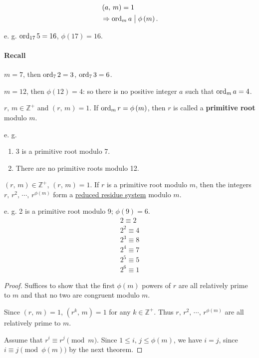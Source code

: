 \begin{corollary}
    \begin{align*}
        & \left(a,\,m\right)=1 \\
        &\Rightarrow \operatorname{\mathrm{ord}}_m a \bigm| \phi\left(m\right).
    \end{align*}
\end{corollary}

e. g. $\operatorname{\mathrm{ord}}_{17} 5 = 16$, $\phi\left(17\right)=16$.

\paragraph{Recall} $m=7$, then $\operatorname{\mathrm{ord}}_7 2 = 3$, $\operatorname{\mathrm{ord}}_7 3 = 6$.

$m=12$, then $\phi\left(12\right)=4$: so there is no positive integer $a$
such that $\operatorname{\mathrm{ord}}_m a = 4$.

\begin{definition}
    $r,\,m \in \mathbb{Z}^+$ and $\left(r,\,m\right)=1$.
    If $\operatorname{\mathrm{ord}}_m r=\phi\left(m\right)$, then $r$ is called a \textbf{primitive root}
    modulo $m$.   
\end{definition}
e. g.
\begin{enumerate}
    \item 3 is a primitive root modulo 7.
    \item There are no primitive roots modulo 12.
\end{enumerate}

\begin{theorem}
    $\left(r,\,m\right) \in \mathbb{Z}^+$, $\left(r,\,m\right)=1$.
    If $r$ is a primitive root modulo $m$, then the integers
    $r,\,r^2,\,\cdots,\,r^{\phi\left(m\right)}$ form a \underline{reduced residue system}
    modulo $m$.
\end{theorem}

e. g. 2 is a primitive root modulo 9; $\phi\left(9\right)=6$.
\begin{align*}
    2 \equiv 2 \\
    2^2 \equiv 4 \\
    2^3 \equiv 8 \\
    2^4 \equiv 7 \\
    2^5 \equiv 5 \\
    2^6 \equiv 1
\end{align*}

\begin{proof}
    Suffices to show that the first $\phi\left(m\right)$ powers of
    $r$ are all relatively prime to $m$ and that no two are
    congruent modulo $m$.

    Since $\left(r,\,m\right)=1$, $\left(r^k,\,m\right)=1$ for any $k \in \mathbb{Z}^+$.
    Thus $r,\,r^2,\,\cdots,\,r^{\phi\left(m\right)}$ are all relatively prime to $m$.

    Assume that $r^i \equiv r^j \pmod{m}$. Since $1 \leq i,\,j \leq \phi\left(m\right)$, we have
    $i=j$, since $i \equiv j \pmod{\phi\left(m\right)}$ by the next theorem.
\end{proof}

